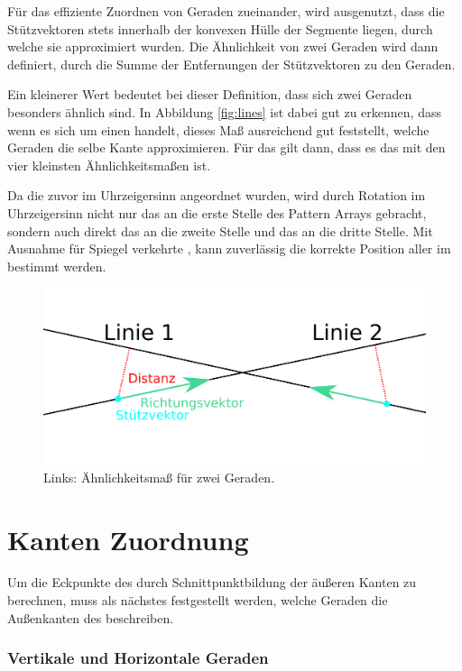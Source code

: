 Für das effiziente Zuordnen von Geraden zueinander, wird ausgenutzt, dass die Stützvektoren stets innerhalb der konvexen Hülle der Segmente liegen, durch welche sie approximiert wurden. Die Ähnlichkeit von zwei Geraden wird dann definiert, durch die Summe der Entfernungen der Stützvektoren zu den Geraden.


Ein kleinerer Wert bedeutet bei dieser Definition, dass sich zwei Geraden besonders ähnlich sind. In Abbildung \ref{fig:lines} ist dabei gut zu erkennen, dass wenn es sich um einen \QRCode handelt, dieses Maß ausreichend gut feststellt, welche Geraden die selbe Kante approximieren. Für das \olfp gilt dann, dass es das \fp mit den vier kleinsten Ähnlichkeitsmaßen ist.

Da die \fps zuvor im Uhrzeigersinn angeordnet wurden, wird durch Rotation im Uhrzeigersinn nicht nur das \olfp an die erste Stelle des Pattern Arrays gebracht, sondern auch direkt das \orfp an die zweite Stelle und das \ulfp an die dritte Stelle. Mit Ausnahme für Spiegel verkehrte \QRCodes, kann zuverlässig die korrekte Position aller \fps im \QRCode bestimmt werden.

\begin{figure}[h]
\center
\includegraphics[scale=1]{images/similarity_measure.png}
\caption{Links: Ähnlichkeitsmaß für zwei Geraden.}
\end{figure}

\section{Kanten Zuordnung}
Um die Eckpunkte des \QRCodes durch Schnittpunktbildung der äußeren Kanten zu berechnen, muss als nächstes festgestellt werden, welche Geraden die Außenkanten des \QRCodes beschreiben.

\subsubsection{Vertikale und Horizontale Geraden}

